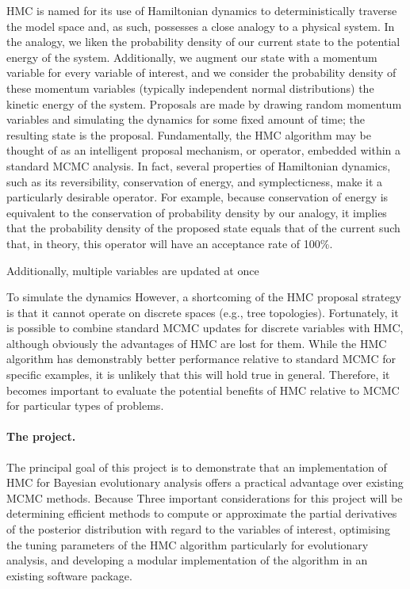 \documentclass{article}
\begin{document}
    \ac{HMC} is named for its use of Hamiltonian dynamics to deterministically
        traverse the model space and, as such, possesses a close analogy to a
        physical system.
    In the analogy, we liken the probability density of our current state to
        the potential energy of the system.
    Additionally, we augment our state with a momentum variable for every
        variable of interest, and we consider the probability density of these
        momentum variables (typically independent normal distributions) the
        kinetic energy of the system.
    Proposals are made by drawing random momentum variables and simulating the
        dynamics for some fixed amount of time; the resulting state is the
        proposal.
    Fundamentally, the \ac{HMC} algorithm may be thought of as an intelligent
        proposal mechanism, or operator, embedded within a standard \ac{MCMC}
        analysis.
    In fact, several properties of Hamiltonian dynamics, such as its
        reversibility, conservation of energy, and symplecticness, make it a
        particularly desirable operator.
    For example, because conservation of energy is equivalent to the
        conservation of probability density by our analogy, it implies that the
        probability density of the proposed state equals that of the current
        such that, in theory, this operator will have an acceptance rate of
        100\%.

    Additionally, multiple variables are updated at once

    To simulate the dynamics
    However, a shortcoming of the \ac{HMC} proposal strategy is that it cannot
        operate on discrete spaces (e.g., tree topologies).
    Fortunately, it is possible to combine standard \ac{MCMC} updates for
        discrete variables with \ac{HMC}, although obviously the advantages of
        \ac{HMC} are lost for them.
    While the \ac{HMC} algorithm has demonstrably better performance relative
        to standard \ac{MCMC} for specific examples, it is unlikely that this
        will hold true in general.
    Therefore, it becomes important to evaluate the potential benefits of
        \ac{HMC} relative to \ac{MCMC} for particular types of problems.

    \paragraph*{The project.}

    The principal goal of this project is to demonstrate that an implementation
        of \ac{HMC} for Bayesian evolutionary analysis offers a practical
        advantage over existing \ac{MCMC} methods.
    Because
    Three important considerations for this project will be determining
        efficient methods to compute or approximate the partial derivatives of
        the posterior distribution with regard to the variables of interest,
        optimising the tuning parameters of the \ac{HMC} algorithm particularly
        for evolutionary analysis, and developing a modular implementation of
        the algorithm in an existing software package.
\end{document}
